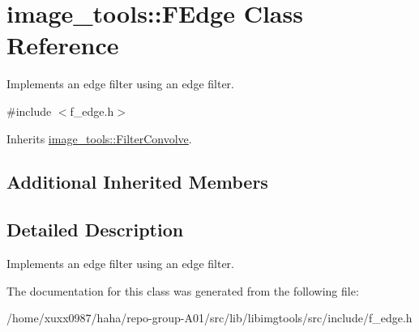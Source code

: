 \hypertarget{classimage__tools_1_1FEdge}{}\section{image\+\_\+tools\+:\+:F\+Edge Class Reference}
\label{classimage__tools_1_1FEdge}


Implements an edge filter using an edge filter.  




{\ttfamily \#include $<$f\+\_\+edge.\+h$>$}



Inherits \hyperlink{classimage__tools_1_1FilterConvolve}{image\+\_\+tools\+::\+Filter\+Convolve}.

\subsection*{Additional Inherited Members}


\subsection{Detailed Description}
Implements an edge filter using an edge filter. 

The documentation for this class was generated from the following file\+:\begin{DoxyCompactItemize}
\item 
/home/xuxx0987/haha/repo-\/group-\/\+A01/src/lib/libimgtools/src/include/f\+\_\+edge.\+h\end{DoxyCompactItemize}
